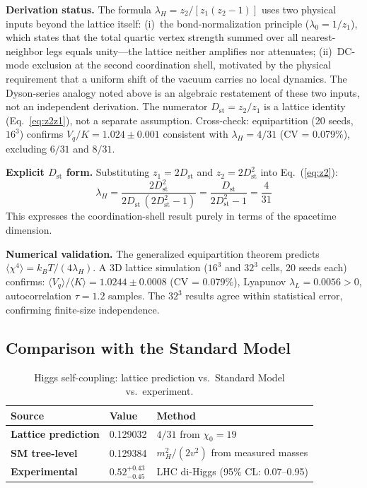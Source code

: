 \documentclass[12pt,a4paper]{article}
\newcommand{\chizero}{\chi_0}
\newcommand{\Dst}{D_{\mathrm{st}}}
\begin{document}
\textbf{Derivation status.} The formula $\lambda_H = z_2/[z_1(z_2 - 1)]$ uses two physical inputs beyond the lattice itself: (i)~the bond-normalization principle ($\lambda_0 = 1/z_1$), which states that the total quartic vertex strength summed over all nearest-neighbor legs equals unity---the lattice neither amplifies nor attenuates; (ii)~DC-mode exclusion at the second coordination shell, motivated by the physical requirement that a uniform shift of the vacuum carries no local dynamics. The Dyson-series analogy noted above is an algebraic restatement of these two inputs, not an independent derivation. The numerator $\Dst = z_2/z_1$ is a lattice identity (Eq.~\ref{eq:z2z1}), not a separate assumption. Cross-check: equipartition (20 seeds, $16^3$) confirms $V_q/K = 1.024 \pm 0.001$ consistent with $\lambda_H = 4/31$ (CV = 0.079\%), excluding $6/31$ and $8/31$.

\textbf{Explicit $\Dst$ form.} Substituting $z_1 = 2\Dst$ and $z_2 = 2\Dst^2$ into Eq.~(\ref{eq:z2}):
\begin{equation}
\lambda_H = \frac{2\Dst^2}{2\Dst\,(2\Dst^2 - 1)} = \frac{\Dst}{2\Dst^2 - 1} = \frac{4}{31}
\end{equation}
This expresses the coordination-shell result purely in terms of the spacetime dimension.

\textbf{Numerical validation.} The generalized equipartition theorem \citep{Gibbs1902} predicts $\langle \chi^4 \rangle = k_B T / (4\lambda_H)$. A 3D lattice simulation ($16^3$ and $32^3$ cells, 20 seeds each) confirms: $\langle V_q \rangle / \langle K \rangle = 1.0244 \pm 0.0008$ (CV = 0.079\%), Lyapunov $\lambda_L = 0.0056 > 0$, autocorrelation $\tau = 1.2$ samples. The $32^3$ results agree within statistical error, confirming finite-size independence.

\subsection{Comparison with the Standard Model}

\begin{table}[h]
\centering
\begin{tabular}{lll}
\toprule
Source & Value & Method \\
\midrule
\textbf{Lattice prediction} & 0.129032 & $4/31$ from $\chizero = 19$ \\
\textbf{SM tree-level} & 0.129384 & $m_H^2/(2v^2)$ from measured masses \\
\textbf{Experimental} & $0.52^{+0.43}_{-0.45}$ & LHC di-Higgs (95\% CL: 0.07--0.95) \\
\bottomrule
\end{tabular}
\caption{Higgs self-coupling: lattice prediction vs.\ Standard Model vs.\ experiment.}
\label{tab:comparison}
\end{table}
\end{document}
